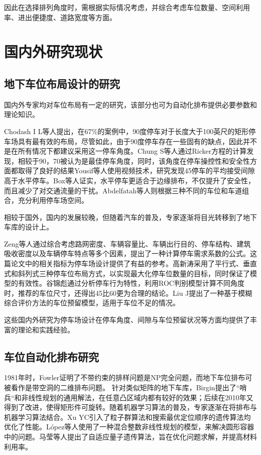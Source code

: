 因此在选择排列角度时，需根据实际情况考虑，并综合考虑车位数量、空间利用率、进出便捷度、道路宽度等方面。
\section{国内外研究现状}
\subsection{地下车位布局设计的研究}
国内外专家均对车位布局有一定的研究，该部分也可为自动化排布提供必要参数和理论知识。

Chodash I L\cite{chodash1986relative}等人提出，在67\%的案例中，90度停车对于长度大于100英尺的矩形停车场具有最有效的布局，尽管如此，由于90度停车存在一些固有的缺点，因此并不是在所有情况下都建议采用这一停车角度。Chung S\cite{chen1988optimum}等人通过Ricker方程的计算发现，相较于90\textdegree，70\textdegree 被认为是最佳停车角度，同时，该角度在停车操控性和安全性方面都取得了良好的结果Yousif\cite{yousif2000comparison}等人使用视频技术，研究发现45\textdegree 停车的平均接受间隙高于水平停车。Box\cite{box2002angle}等人证实，水平停车更适合于边缘排布，不仅提升了安全性，而且减少了对交通流量的干扰。Abdelfatah\cite{abdelfatah2014parking}等人则根据三种不同的车位和车道组合，充分利用停车场空间。

相较于国外，国内的发展较晚，但随着汽车的普及，专家逐渐将目光转移到了地下车库的设计上。

Zeng\cite{zeng2009research}等人通过综合考虑路网密度、车辆容量比、车辆出行目的、停车结构、建筑吸收密度以及车辆停车特点等多个因素，提出了一种计算停车需求系数的公式。这篇论文中的相关指标为停车场设计提供了有益的参考。高新涛\cite{HNKJ201518025}采用了平行式、垂直式和斜列式三种停车位布局方式，以实现最大化停车位数量的目标，同时保证了模型的有效性。谷锦彪\cite{1017056100.nh}通过分析停车行为特性，利用ROC判别模型计算不同角度时，推荐的车位尺寸，还得出45\textdegree 比60\textdegree 更为合理的结论。Liu J\cite{liu2021parking}提出了一种基于模糊综合评价方法的车位预留模型，适用于车位不足的情况。

这些国内外研究为停车场设计在停车角度、间隙与车位预留状况等方面均提供了丰富的理论和实践经验。
\subsection{车位自动化排布研究}
1981年时，Fowler\cite{fowler1981optimal}证明了不带约束的排样问题是NP完全问题，而地下车位排布可被看作是带空洞的二维排布问题。
针对类似矩阵的地下车库，Birgin\cite{birgin2006method, birgin2006orthogonal}提出了“哨兵“和非线性规划的通用解法，在任意凸区域内都有较好的效果；后续在2010年又得到了改进\cite{birgin2010orthogonal}，使得矩形件可旋转。随着机器学习算法的普及，专家逐渐在将排布与机器学习算法结合。Xu YC\cite{xu2007particle, xu2010genetic}引入了粒子群算法和搜索最优定位顺序的遗传算法均优化了性能。L{\'o}pez\cite{lopez2018packing}等人使用了一种混合整数非线性规划的模型，来解决圆形容器中的问题。马莹\cite{JSGG201820015}等人提出了自适应量子遗传算法，旨在优化问题求解，并提高材料利用率。

